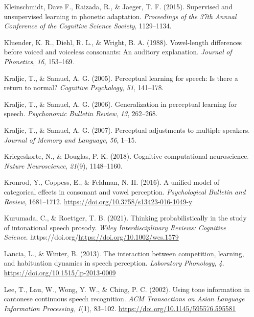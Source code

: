 \documentclass[
  11pt,
  english,
  man,floatsintext]{apa6}
\newlength{\cslhangindent}
\newlength{\cslentryspacingunit} %
\newenvironment{CSLReferences}[2] %
 {%
  \setlength{\parindent}{0pt}
  \ifodd #1
  \let\oldpar\par
  \def\par{\hangindent=\cslhangindent\oldpar}
  \fi
  \setlength{\parskip}{#2\cslentryspacingunit}
 }%
 {}
\begin{document}
\begin{CSLReferences}{1}{0}
\leavevmode{}%
Kleinschmidt, Dave F., Raizada, R., \& Jaeger, T. F. (2015). Supervised and unsupervised learning in phonetic adaptation. \emph{Proceedings of the 37th Annual Conference of the Cognitive Science Society}, 1129--1134.

\leavevmode{}%
Kluender, K. R., Diehl, R. L., \& Wright, B. A. (1988). Vowel-length differences before voiced and voiceless consonants: An auditory explanation. \emph{Journal of Phonetics}, \emph{16}, 153--169.

\leavevmode{}%
Kraljic, T., \& Samuel, A. G. (2005). Perceptual learning for speech: Is there a return to normal? \emph{Cognitive Psychology}, \emph{51}, 141--178.

\leavevmode{}%
Kraljic, T., \& Samuel, A. G. (2006). Generalization in perceptual learning for speech. \emph{Psychonomic Bulletin Review}, \emph{13}, 262--268.

\leavevmode{}%
Kraljic, T., \& Samuel, A. G. (2007). Perceptual adjustments to multiple speakers. \emph{Journal of Memory and Language}, \emph{56}, 1--15.

\leavevmode{}%
Kriegeskorte, N., \& Douglas, P. K. (2018). Cognitive computational neuroscience. \emph{Nature Neuroscience}, \emph{21}(9), 1148--1160.

\leavevmode{}%
Kronrod, Y., Coppess, E., \& Feldman, N. H. (2016). A unified model of categorical effects in consonant and vowel perception. \emph{Psychological Bulletin and Review}, 1681--1712. \url{https://doi.org/10.3758/s13423-016-1049-y}

\leavevmode{}%
Kurumada, C., \& Roettger, T. B. (2021). Thinking probabilistically in the study of intonational speech prosody. \emph{Wiley Interdisciplinary Reviews: Cognitive Science}. https://doi.org/\url{https://doi.org/10.1002/wcs.1579}

\leavevmode{}%
Lancia, L., \& Winter, B. (2013). The interaction between competition, learning, and habituation dynamics in speech perception. \emph{Laboratory Phonology}, \emph{4}. \url{https://doi.org/10.1515/lp-2013-0009}

\leavevmode{}%
Lee, T., Lau, W., Wong, Y. W., \& Ching, P. C. (2002). Using tone information in cantonese continuous speech recognition. \emph{ACM Transactions on Asian Language Information Processing}, \emph{1}(1), 83--102. \url{https://doi.org/10.1145/595576.595581}


\end{CSLReferences}
\end{document}
